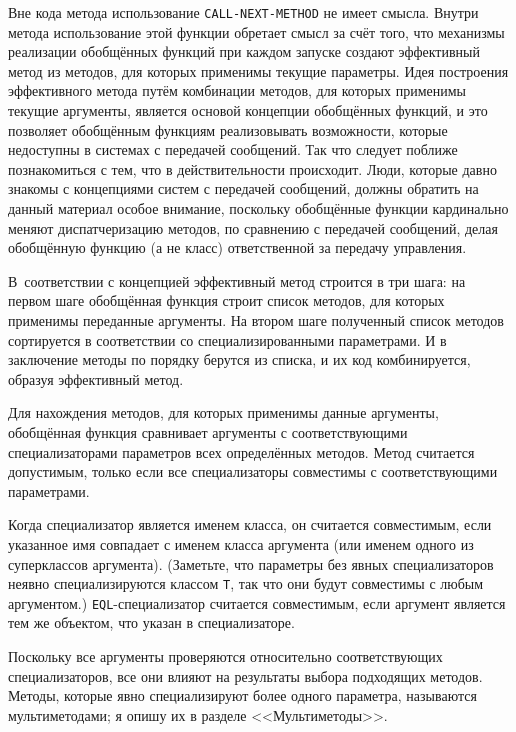 Вне кода метода использование \lstinline{CALL-NEXT-METHOD} не имеет смысла.  Внутри метода
использование этой функции обретает смысл за счёт того, что механизмы реализации
обобщённых функций при каждом запуске создают эффективный метод из методов, для которых
применимы текущие параметры.  Идея построения эффективного метода путём комбинации
методов, для которых применимы текущие аргументы, является основой концепции обобщённых
функций, и это позволяет обобщённым функциям реа\-ли\-зо\-вы\-вать возможности, которые недоступны
в системах с передачей сообщений.  Так что следует поближе познакомиться с тем, что в
действительности происходит.  Люди, которые давно знакомы с концепциями систем с передачей
сообщений, должны обратить на данный материал особое внимание, поскольку обобщённые функции
кардинально меняют диспатчеризацию методов, по сравнению с передачей сообщений, делая
обобщённую функцию (а не класс) ответственной за передачу управления.

В~соответствии с концепцией эффективный метод строится в три шага: на первом шаге
обобщённая функция строит список методов, для которых применимы переданные аргументы.  На
втором шаге полученный список методов сортируется в соответствии со специализированными
параметрами.  И в заключение методы по порядку берутся из списка, и их код комбинируется,
образуя эффективный метод.

Для нахождения методов, для которых применимы данные аргументы, обобщённая функция
сравнивает аргументы с соответствующими специализаторами параметров всех определённых
методов.  Метод считается допустимым, только если все специализаторы совместимы с
соответствующими параметрами.

Когда специализатор является именем класса, он считается совместимым, если указанное имя
совпадает с именем класса аргумента (или именем одного из суперклассов аргумента).
(Заметьте, что параметры без явных специализаторов неявно специализируются классом
\lstinline{T}, так что они будут совместимы с любым аргументом.)  \lstinline{EQL}-специализатор
считается совместимым, если аргумент является тем же объектом, что указан в
специализаторе.

Поскольку все аргументы проверяются относительно соответствующих специализаторов, все они
влияют на результаты выбора подходящих методов.  Методы, которые явно специализируют более
одного параметра, называются мультиметодами; я опишу их в разделе <<Мультиметоды>>.

